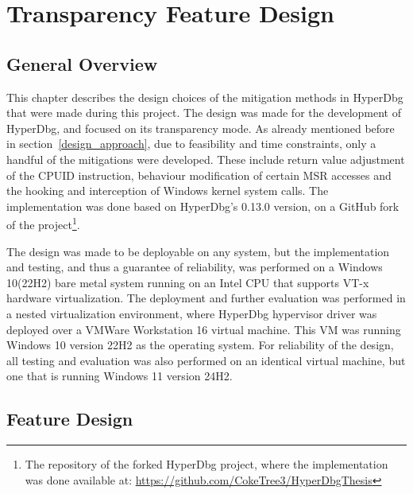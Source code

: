 \section{Transparency Feature Design}\label{s:design}

\subsection{General Overview}
This chapter describes the design choices of the mitigation methods in HyperDbg that were made during this project. The design was made for the development of HyperDbg, and focused on its transparency mode. 
As already mentioned before in section~\ref{design_approach}, due to feasibility and time constraints, only a handful of the mitigations were developed. 
These include return value adjustment of the CPUID instruction, behaviour modification of certain MSR accesses and the hooking and interception of Windows kernel system calls. 
The implementation was done based on HyperDbg's 0.13.0 version, on a GitHub fork of the project\footnote{The repository of the forked HyperDbg project, where the implementation was done available at: \url{https://github.com/CokeTree3/HyperDbgThesis}}.

The design was made to be deployable on any system, but the implementation and testing, and thus a guarantee of reliability, was performed on a Windows 10(22H2) bare metal system running on an Intel CPU that supports VT-x hardware virtualization. 
The deployment and further evaluation was performed in a nested virtualization environment, where HyperDbg hypervisor driver was deployed over a VMWare Workstation 16 virtual machine. 
This VM was running Windows 10 version 22H2 as the operating system. For reliability of the design, all testing and evaluation was also performed on an identical virtual machine, but one that is running Windows 11 version 24H2.

\subsection{Feature Design}
